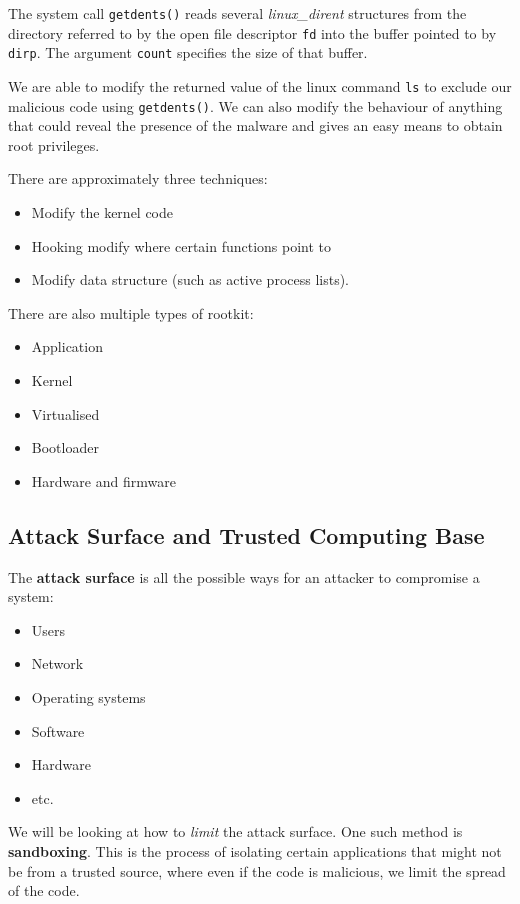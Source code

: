 \documentclass[11pt,a4paper,titlepage,dvipsnames,cmyk]{scrartcl}
\begin{document}
The system call \texttt{getdents()} reads several \textit{linux\_dirent} structures from the directory referred to by the open file descriptor \texttt{fd} into the buffer pointed to by \texttt{dirp}. The argument \texttt{count} specifies the size of that buffer.

We are able to modify the returned value of the linux command \texttt{ls} to exclude our malicious code using \texttt{getdents()}. We can also modify the behaviour of anything that could reveal the presence of the malware and gives an easy means to obtain root privileges.

There are approximately three techniques:
\begin{itemize}
    \item Modify the kernel code
    \item Hooking modify where certain functions point to
    \item Modify data structure (such as active process lists).
\end{itemize}

There are also multiple types of rootkit:
\begin{itemize}
    \item Application
    \item Kernel
    \item Virtualised
    \item Bootloader
    \item Hardware and firmware
\end{itemize}

\subsection{Attack Surface and Trusted Computing Base}
The \textbf{attack surface} is all the possible ways for an attacker to compromise a system:
\begin{itemize}
    \item Users
    \item Network
    \item Operating systems
    \item Software
    \item Hardware
    \item etc.
\end{itemize}

We will be looking at how to \textit{limit} the attack surface. One such method is \textbf{sandboxing}. This is the process of isolating certain applications that might not be from a trusted source, where even if the code is malicious, we limit the spread of the code.
\end{document}

